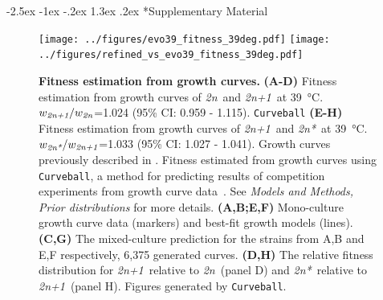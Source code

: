 \documentclass[12pt]{extarticle}
\makeatletter
\renewcommand\section{\@startsection {section}{1}{\z@}%
     {-2.5ex \@plus -1ex \@minus -.2ex}%
     {1.3ex \@plus.2ex}%
    {\Large\bfseries}}
\newcommand{\euwt}{\emph{2n}}
\newcommand{\anwt}{\emph{2n+1}}
\newcommand{\eumt}{\emph{2n*}}
\newcommand{\beginsupplement}{%
      	\setcounter{table}{0}
        \renewcommand{\thetable}{S\arabic{table}}%
        \setcounter{figure}{0}
        \renewcommand{\thefigure}{S\arabic{figure}}%
}
\makeatother
\begin{document}
\newpage

\section*{Supplementary Material}
\beginsupplement %

\begin{figure}[h]
	\centering
	\texttt{[image: ../figures/evo39\_fitness\_39deg.pdf]} 
	\texttt{[image: ../figures/refined\_vs\_evo39\_fitness\_39deg.pdf]}
\caption{
    \textbf{Fitness estimation from growth curves.}
    \textbf{(A-D)} Fitness estimation from growth curves of \euwt\ and \anwt\ at \SI{39}{\celsius}. $ w_{\anwt}/w_{\euwt}$=1.024 (95\% CI: 0.959 - 1.115). \texttt{Curveball} 
    \textbf{(E-H)} Fitness estimation from growth curves of \anwt\ and \eumt\ at \SI{39}{\celsius}. $ w_{\eumt}/w_{\anwt}$=1.033 (95\% CI: 1.027 - 1.041).
    Growth curves previously described in \citet[Figs. 3C, 4A, and S2]{Yona2012}.
	Fitness estimated from growth curves using \texttt{Curveball}, a method for predicting results of competition experiments from growth curve data~\citep[\href{https://curveball.yoavram.com}{curveball.yoavram.com}]{Ram2019}. See \emph{Models and Methods, Prior distributions} for more details.  \textbf{(A,B;E,F)} Mono-culture growth curve data (markers) and best-fit growth models (lines).
\textbf{(C,G)} The mixed-culture prediction for the strains from A,B and E,F respectively, 6,375 generated curves. \textbf{(D,H)} The relative fitness distribution for \anwt\ relative to \euwt\ (panel D) and \eumt\ relative to \anwt\ (panel H). Figures generated by \texttt{Curveball}.
} 
\label{fig:growth-curves}
\end{figure}
\end{document}
